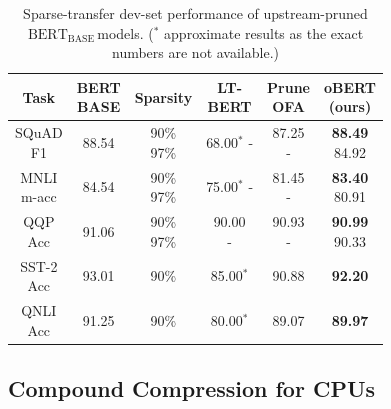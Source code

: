\documentclass[11pt]{article}
\newcommand{\bert}{$\textrm{BERT}_{\textrm{BASE}}\,$}
\begin{document}
\begin{table}[tb!]
\setlength{\tabcolsep}{5.5pt}
    \caption{Sparse-transfer dev-set performance of upstream-pruned \bert models. ($^*$ approximate results as the exact numbers are not available.)}
    \label{tab:sparse-transfer}
    \centering
    {\small 
    \begin{tabular}{ccc|ccc}
    \toprule 
    Task & \makecell{BERT\\{\scriptsize BASE}} & Sparsity & \makecell{LT-\\BERT} & \makecell{Prune\\OFA} & \makecell{oBERT\\(ours)} \\
    \midrule
    \makecell{SQuAD \\ F1} & 88.54 & \makecell{90\% \\ 97\%} & \makecell{68.00$^*$\\-} & \makecell{87.25\\ -} & \makecell{\textbf{88.49}\\ 84.92} \\
    \midrule
    \makecell{MNLI \\ m-acc} & 84.54 & \makecell{90\% \\ 97\%}  & \makecell{75.00$^*$\\-} & \makecell{81.45\\ -} & \makecell{\textbf{83.40} \\ 80.91} \\
    \midrule
    \makecell{QQP \\ Acc} & 91.06 &  \makecell{90\% \\ 97\%} & \makecell{90.00\\-} & \makecell{90.93 \\ -} & \makecell{\textbf{90.99} \\ 90.33} \\
    \midrule
    \makecell{SST-2\\Acc} & 93.01 & 90\% & 85.00$^*$ & 90.88 & \textbf{92.20} \\
    \midrule
    \makecell{QNLI\\Acc} & 91.25 & 90\% & 80.00$^*$ & 89.07 & \textbf{89.97} \\
    \bottomrule
    \end{tabular}
    }
    \vspace{-1.2em}
\end{table}

\subsection{Compound Compression for CPUs}
\label{sec:compound}
\end{document}
